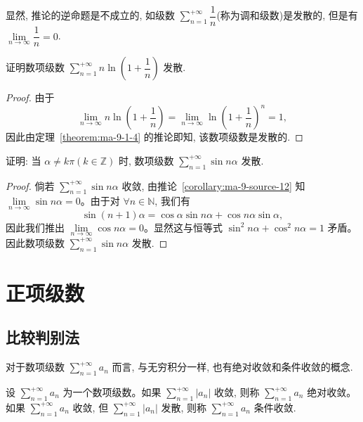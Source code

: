 显然, 推论的逆命题是不成立的, 如级数 $\sum\limits_{n=1}^{+\infty}\dfrac1n$(称为调和级数)是发散的, 但是有 $\lim\limits_{n\to\infty}\dfrac1n=0$.

\begin{example}\label{example:ma-9-1-4}
证明数项级数 $\sum\limits_{n=1}^{+\infty}n\ln\left(1+\dfrac1n\right)$ 发散.
\end{example}


\begin{proof}
由于
\[
  \lim_{n\to\infty}n\ln\left(1+\frac1n\right)
  =\lim_{n\to\infty}\ln\left(1+\frac1n\right)^n=1,
\]
因此由定理~\ref{theorem:ma-9-1-4} 的推论即知, 该数项级数是发散的.
\end{proof}


\begin{example}\label{example:ma-9-1-5}
证明: 当 $\alpha\neq k\pi(k\in\mathbb Z)$ 时, 数项级数 $\sum\limits_{n=1}^{+\infty}\sin n\alpha$ 发散.
\end{example}


\begin{proof}
倘若 $\sum\limits_{n=1}^{+\infty}\sin n\alpha$ 收敛, 由推论~\ref{corollary:ma-9-source-12} 知 $\lim\limits_{n\to\infty}\sin n\alpha=0$。由于对 $\forall n\in\mathbb N$, 我们有
\[
  \sin(n+1)\alpha=\cos\alpha\sin n\alpha+\cos n\alpha\sin\alpha,
\]
因此我们推出 $\lim\limits_{n\to\infty}\cos n\alpha=0$。显然这与恒等式 $\sin^2n\alpha+\cos^2n\alpha=1$ 矛盾。因此数项级数 $\sum\limits_{n=1}^{+\infty}\sin n\alpha$ 发散.
\end{proof}


\section{正项级数}
\label{sec:ma-9-2}

\subsection{比较判别法}
\label{subsec:ma-9-2-1}

对于数项级数 $\sum\limits_{n=1}^{+\infty}a_n$ 而言, 与无穷积分一样, 也有绝对收敛和条件收敛的概念.

\begin{definition}\label{definition:ma-9-2-1}
设 $\sum\limits_{n=1}^{+\infty}a_n$ 为一个数项级数。如果 $\sum\limits_{n=1}^{+\infty}|a_n|$ 收敛, 则称 $\sum\limits_{n=1}^{+\infty}a_n$ 绝对收敛。如果 $\sum\limits_{n=1}^{+\infty}a_n$ 收敛, 但 $\sum\limits_{n=1}^{+\infty}|a_n|$ 发散, 则称 $\sum\limits_{n=1}^{+\infty}a_n$ 条件收敛.
\end{definition}

